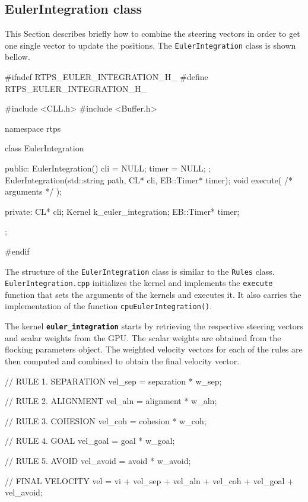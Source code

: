 


\subsection{EulerIntegration class} \label{eulerclass}
This Section describes briefly how to combine the steering vectors in order to get one single vector to update the positions. The \texttt{EulerIntegration} class is shown bellow.

\begin{cppcode}{0}
#ifndef RTPS_EULER_INTEGRATION_H_
#define RTPS_EULER_INTEGRATION_H_

#include <CLL.h>
#include <Buffer.h>

namespace rtps
{
	class EulerIntegration
	{
		public:
			EulerIntegration() { cli = NULL; timer = NULL; };
	 		EulerIntegration(std::string path, CL* cli, EB::Timer* timer);
			void execute( /* arguments */ );

		private:
			CL* cli;
			Kernel k_euler_integration;
			EB::Timer* timer;
	};
}
#endif
\end{cppcode}

The structure of the \texttt{EulerIntegration} class is similar to the \texttt{Rules} class. \texttt{EulerIntegration.cpp} initializes the kernel and implements the \texttt{execute} function that sets the arguments of the kernels and executes it. It also carries the implementation of the function \texttt{cpuEulerIntegration()}. 

The kernel \texttt{\textbf{euler\_integration}} starts by retrieving the respective steering vectors and scalar weights from the GPU. The scalar weights are obtained from the flocking parameters object. The weighted velocity vectors for each of the rules are then computed and combined to obtain the final velocity vector.

\begin{cppcode}{0}
// RULE 1. SEPARATION
vel_sep = separation * w_sep;
   
// RULE 2. ALIGNMENT
vel_aln = alignment * w_aln;

// RULE 3. COHESION
vel_coh = cohesion * w_coh;

// RULE 4. GOAL
vel_goal = goal * w_goal;

// RULE 5. AVOID
vel_avoid = avoid * w_avoid;

// FINAL VELOCITY
vel = vi + vel_sep + vel_aln + vel_coh + vel_goal + vel_avoid;
\end{cppcode}


